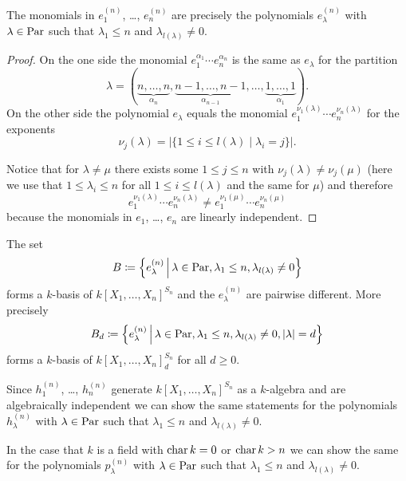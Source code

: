\begin{prop}
  The monomials in $e^{(n)}_1$, \dots, $e^{(n)}_n$ are precisely the polynomials $e^{(n)}_\lambda$ with $\lambda \in \operatorname{Par}$ such that $\lambda_1 \leq n$ and $\lambda_{l(\lambda)} \neq 0$.
\end{prop}
\begin{proof}
  On the one side the monomial $e_1^{\alpha_1} \dotsm e_n^{\alpha_n}$ is the same as $e_\lambda$ for the partition
  \[
      \lambda
    = (
        \underbrace{n, \dotsc, n}_{\alpha_n},
        \underbrace{n-1, \dotsc, n-1}_{\alpha_{n-1}},
        \dotsc,
        \underbrace{1, \dotsc, 1}_{\alpha_1}
      ).
  \]
  On the other side the polynomial $e_\lambda$ equals the monomial $e_1^{\nu_1(\lambda)} \dotsm e_n^{\nu_n(\lambda)}$ for the exponents
  \[
      \nu_j(\lambda)
    = |
        \{
          1 \leq i \leq l(\lambda)
        \mid
          \lambda_i = j
        \}
      |.
  \]
  
  Notice that for $\lambda \neq \mu$ there exists some $1 \leq j \leq n$ with $\nu_j(\lambda) \neq \nu_j(\mu)$ (here we use that $1 \leq \lambda_i \leq n$ for all $1 \leq i \leq l(\lambda)$ and the same for $\mu$) and therefore
  \[
          e_1^{\nu_1(\lambda)} \dotsm e_n^{\nu_n(\lambda)}
    \neq  e_1^{\nu_1(\mu)} \dotsm e_n^{\nu_n(\mu)}
  \]
  because the monomials in $e_1$, \dots, $e_n$ are linearly independent.
\end{proof}


\begin{cor}
  The set
  \[
              B
    \coloneqq \left\{
                e^{(n)}_\lambda
              \,\middle|\,
                \lambda \in \operatorname{Par},
                \lambda_1 \leq n,
                \lambda_{l(\lambda)} \neq 0
              \right\}
  \]
  forms a $k$-basis of $k[X_1, \dotsc, X_n]^{S_n}$ and the $e^{(n)}_\lambda$ are pairwise different.
  More precisely
  \[
              B_d
    \coloneqq \left\{
                e^{(n)}_\lambda
              \,\middle|\,
                \lambda \in \operatorname{Par},
                \lambda_1 \leq n,
                \lambda_{l(\lambda)} \neq 0,
                |\lambda| = d
              \right\}
  \]
  forms a $k$-basis of $k[X_1, \dotsc, X_n]^{S_n}_d$ for all $d \geq 0$.
\end{cor}


\begin{rem}
  Since $h^{(n)}_1$, \dots, $h^{(n)}_n$ generate $k[X_1, \dotsc, X_n]^{S_n}$ as a $k$-algebra and are algebraically independent we can show the same statements for the polynomials $h^{(n)}_\lambda$ with $\lambda \in \operatorname{Par}$ such that $\lambda_1 \leq n$ and $\lambda_{l(\lambda)} \neq 0$.
  
  In the case that $k$ is a field with $\operatorname{char} k = 0$ or $\operatorname{char} k > n$ we can show the same for the polynomials $p^{(n)}_\lambda$ with $\lambda \in \operatorname{Par}$ such that $\lambda_1 \leq n$ and $\lambda_{l(\lambda)} \neq 0$.
\end{rem}


